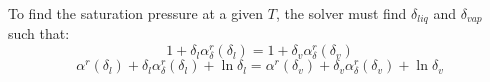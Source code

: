 To find the saturation pressure at a given $T$, the solver must find $\delta_{liq}$ and $\delta_{vap}$ such that:
\begin{equation}
1 + \delta_l \alpha_{\delta}^r(\delta_l) = 1 + \delta_v \alpha_{\delta}^r(\delta_v)
\end{equation}
\begin{equation}
\alpha^r(\delta_l) + \delta_l \alpha_{\delta}^r(\delta_l) + \ln \delta_l = \alpha^r(\delta_v) + \delta_v \alpha_{\delta}^r(\delta_v) + \ln \delta_v
\end{equation}